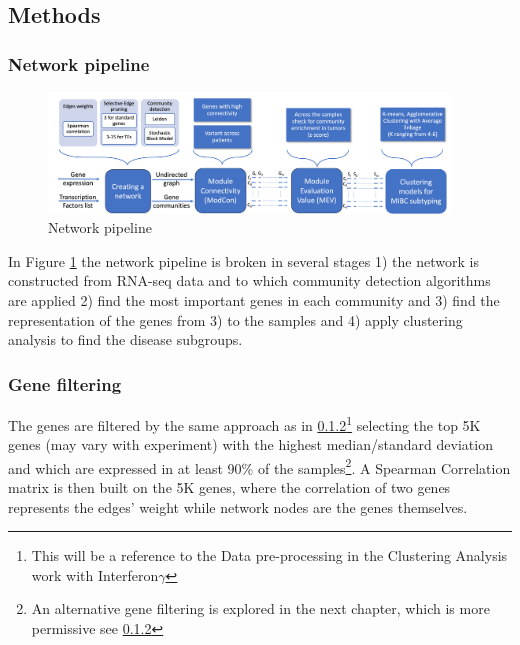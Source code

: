 \subsection{Methods} 

\subsubsection{Network pipeline}


\begin{figure}[!htb]
    \centering\includegraphics[width=0.95\textwidth,height=0.95\textheight,keepaspectratio]{Sections/Network_I/Resources/Methods/network_pipeline.png}
    \caption{Network pipeline}
    \label{fig:N_I:network_pipeline}
\end{figure}


In Figure \ref{fig:N_I:network_pipeline} the network pipeline is broken in several stages 1) the network is constructed from RNA-seq data and to which community detection algorithms are applied 2) find the most important genes in each community and 3) find the representation of the genes from 3) to the samples and 4) apply clustering analysis to find the disease subgroups.


\subsubsection{Gene filtering}
The genes are filtered by the same approach as in \ref{}\footnote{This will be a reference to the Data pre-processing in the Clustering Analysis work with Interferon$\gamma$} selecting the top 5K genes (may vary with experiment) with the highest median/standard deviation and which are expressed in at least 90\% of the samples\footnote{An alternative gene filtering is explored in the next chapter, which is more permissive see \ref{}}. A Spearman Correlation matrix is then built on the 5K genes, where the correlation of two genes represents the edges' weight while network nodes are the genes themselves. 

